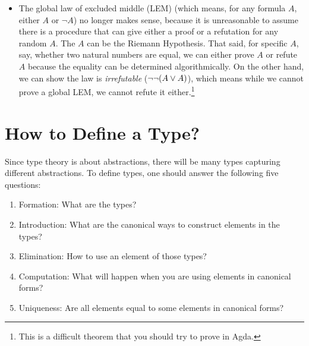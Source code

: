 \documentclass{article}
\begin{document}
\begin{enumerate}
\begin{itemize}
      \item The global law of excluded middle (LEM) (which means, for any formula $A$, either $A$ or $\neg A$) no longer makes sense, because it is unreasonable to assume there is a procedure that can give either a proof or a refutation for any random $A$. The $A$ can be the Riemann Hypothesis. That said, for specific $A$, say, whether two natural numbers are equal, we can either prove $A$ or refute $A$ because the equality can be determined algorithmically. On the other hand, we can show the law is \emph{irrefutable} ($\neg \neg (A \vee A)$), which means while we cannot prove a global LEM, we cannot refute it either.\footnote{This is a difficult theorem that you should try to prove in Agda.}
    \end{itemize}
\end{enumerate}

\section{How to Define a Type?}

Since type theory is about abstractions, there will be many types capturing different abstractions. To define types, one should answer the following five questions:

\begin{enumerate}
  \item Formation: What are the types?
  \item Introduction: What are the canonical ways to construct elements in the types?
  \item Elimination: How to use an element of those types?
  \item Computation: What will happen when you are using elements in canonical forms?
  \item Uniqueness: Are all elements equal to some elements in canonical forms?
\end{enumerate}
\end{document}
